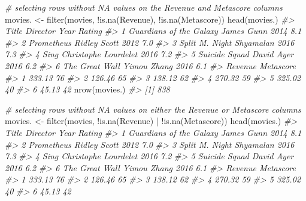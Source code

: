 \documentclass[
]{book}
\newenvironment{Shaded}{\begin{snugshade}}{\end{snugshade}}
\newcommand{\CommentTok}[1]{\textcolor[rgb]{0.56,0.35,0.01}{\textit{#1}}}
\newcommand{\FunctionTok}[1]{\textcolor[rgb]{0.00,0.00,0.00}{#1}}
\newcommand{\NormalTok}[1]{#1}
\newcommand{\OtherTok}[1]{\textcolor[rgb]{0.56,0.35,0.01}{#1}}
\newcommand{\SpecialCharTok}[1]{\textcolor[rgb]{0.00,0.00,0.00}{#1}}
\begin{document}
\begin{Shaded}
\begin{Highlighting}[]
\CommentTok{\# selecting rows without NA values on the Revenue and Metascore columns}
\NormalTok{movies. }\OtherTok{\textless{}{-}} \FunctionTok{filter}\NormalTok{(movies, }\SpecialCharTok{!}\FunctionTok{is.na}\NormalTok{(Revenue), }\SpecialCharTok{!}\FunctionTok{is.na}\NormalTok{(Metascore))}
\FunctionTok{head}\NormalTok{(movies.)}
\CommentTok{\#\textgreater{}                     Title             Director Year Rating}
\CommentTok{\#\textgreater{} 1 Guardians of the Galaxy           James Gunn 2014    8.1}
\CommentTok{\#\textgreater{} 2              Prometheus         Ridley Scott 2012    7.0}
\CommentTok{\#\textgreater{} 3                   Split   M. Night Shyamalan 2016    7.3}
\CommentTok{\#\textgreater{} 4                    Sing Christophe Lourdelet 2016    7.2}
\CommentTok{\#\textgreater{} 5           Suicide Squad           David Ayer 2016    6.2}
\CommentTok{\#\textgreater{} 6          The Great Wall          Yimou Zhang 2016    6.1}
\CommentTok{\#\textgreater{}   Revenue Metascore}
\CommentTok{\#\textgreater{} 1  333.13        76}
\CommentTok{\#\textgreater{} 2  126.46        65}
\CommentTok{\#\textgreater{} 3  138.12        62}
\CommentTok{\#\textgreater{} 4  270.32        59}
\CommentTok{\#\textgreater{} 5  325.02        40}
\CommentTok{\#\textgreater{} 6   45.13        42}
\FunctionTok{nrow}\NormalTok{(movies.)}
\CommentTok{\#\textgreater{} [1] 838}

\CommentTok{\# selecting rows without NA values on either the Revenue or Metascore columns}
\NormalTok{movies. }\OtherTok{\textless{}{-}} \FunctionTok{filter}\NormalTok{(movies, }\SpecialCharTok{!}\FunctionTok{is.na}\NormalTok{(Revenue) }\SpecialCharTok{|} \SpecialCharTok{!}\FunctionTok{is.na}\NormalTok{(Metascore))}
\FunctionTok{head}\NormalTok{(movies.)}
\CommentTok{\#\textgreater{}                     Title             Director Year Rating}
\CommentTok{\#\textgreater{} 1 Guardians of the Galaxy           James Gunn 2014    8.1}
\CommentTok{\#\textgreater{} 2              Prometheus         Ridley Scott 2012    7.0}
\CommentTok{\#\textgreater{} 3                   Split   M. Night Shyamalan 2016    7.3}
\CommentTok{\#\textgreater{} 4                    Sing Christophe Lourdelet 2016    7.2}
\CommentTok{\#\textgreater{} 5           Suicide Squad           David Ayer 2016    6.2}
\CommentTok{\#\textgreater{} 6          The Great Wall          Yimou Zhang 2016    6.1}
\CommentTok{\#\textgreater{}   Revenue Metascore}
\CommentTok{\#\textgreater{} 1  333.13        76}
\CommentTok{\#\textgreater{} 2  126.46        65}
\CommentTok{\#\textgreater{} 3  138.12        62}
\CommentTok{\#\textgreater{} 4  270.32        59}
\CommentTok{\#\textgreater{} 5  325.02        40}
\CommentTok{\#\textgreater{} 6   45.13        42}


\end{Highlighting}
\end{Shaded}
\end{document}
